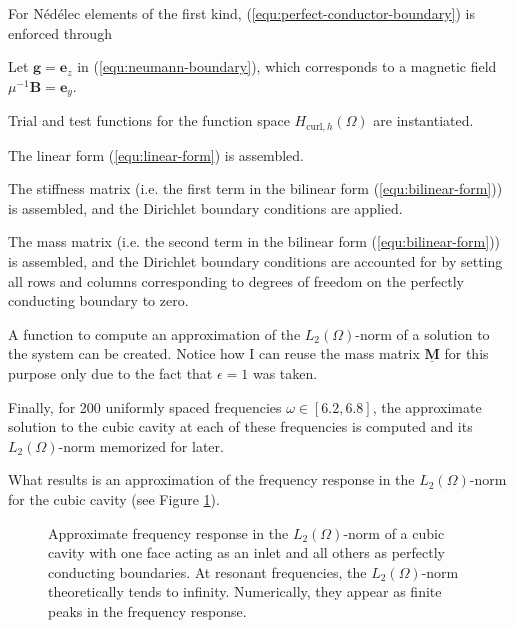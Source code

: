 \documentclass[11pt, a4paper]{article}
\begin{document}
For Nédélec elements of the first kind, (\ref{equ:perfect-conductor-boundary})
is enforced through


Let $\mathbf{g} = \mathbf{e}_z$ in (\ref{equ:neumann-boundary}), which corresponds
to a magnetic field $\mu^{-1} \mathbf{B} = \mathbf{e}_y$.


Trial and test functions for the function space $H_{\mathrm{curl},h}(\Omega)$ are instantiated.


The linear form (\ref{equ:linear-form}) is assembled.


The stiffness matrix (i.e. the first term in the bilinear form (\ref{equ:bilinear-form}))
is assembled, and the Dirichlet boundary conditions are applied.


The mass matrix (i.e. the second term in the bilinear form (\ref{equ:bilinear-form}))
is assembled, and the Dirichlet boundary conditions are accounted for by setting
all rows and columns corresponding to degrees of freedom on the perfectly conducting
boundary to zero.


A function to compute an approximation of the $L_2(\Omega)$-norm of a solution
to the system can be created. Notice how I can reuse the mass matrix
$\mathbf{\underline{M}}$ for this purpose only due to the fact that
$\epsilon = 1$ was taken.


Finally, for 200 uniformly spaced frequencies $\omega \in [6.2, 6.8]$, the 
approximate solution to the cubic cavity at each of these frequencies is
computed and its $L_2(\Omega)$-norm memorized for later.


What results is an approximation of the frequency response in the $L_2(\Omega)$-norm
for the cubic cavity (see Figure \ref{fig:fenics-demonstration}). 
\begin{figure}[h]
    \centering
    
    \caption{Approximate frequency response in the $L_2(\Omega)$-norm of a cubic cavity with
    one face acting as an inlet and all others as perfectly conducting boundaries.
    At resonant frequencies, the $L_2(\Omega)$-norm theoretically tends to infinity.
    Numerically, they appear as finite peaks in the frequency response.}
    \label{fig:fenics-demonstration}
\end{figure}
\end{document}
